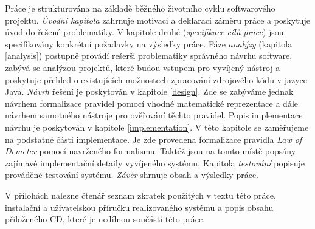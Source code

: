 Práce je strukturována na základě běžného životního cyklu softwarového projektu. \emph{Úvodní kapitola} zahrnuje motivaci a deklaraci záměru práce a poskytuje úvod do řešené problematiky. V kapitole druhé (\emph{specifikace cílů práce}) jsou specifikovány konkrétní požadavky na výsledky práce. Fáze \emph{analýzy} (kapitola \ref{analysis}) postupně provádí rešerši problematiky správného návrhu software, zabývá se analýzou projektů, které budou vstupem pro vyvíjený nástroj a poskytuje přehled o existujících možnostech zpracování zdrojového kódu v jazyce Java. \emph{Návrh} řešení je poskytován v kapitole \ref{design}. Zde se zabýváme jednak návrhem formalizace pravidel pomocí vhodné matematické reprezentace a dále návrhem samotného nástroje pro ověřování těchto pravidel. Popis implementace návrhu je poskytován v kapitole \ref{implementation}. V této kapitole se zaměřujeme na podstatné části implementace. Je zde provedena formalizace pravidla \emph{Law of Demeter} pomocí navrženého formalismu. Taktéž jsou na tomto místě popsány zajímavé implementační detaily vyvíjeného systému. Kapitola \emph{testování} popisuje prováděné testování systému. \emph{Závěr} shrnuje obsah a výsledky práce.

V přílohách nalezne čtenář seznam zkratek použitých v textu této práce, instalační a uživatelskou příručku realizovaného systému a popis obsahu přiloženého CD, které je nedílnou součástí této práce.
